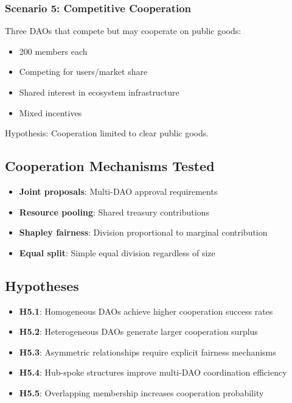 \subsubsection{Scenario 5: Competitive Cooperation}

Three DAOs that compete but may cooperate on public goods:
\begin{itemize}
    \item 200 members each
    \item Competing for users/market share
    \item Shared interest in ecosystem infrastructure
    \item Mixed incentives
\end{itemize}

Hypothesis: Cooperation limited to clear public goods.

\subsection{Cooperation Mechanisms Tested}

\begin{itemize}
    \item \textbf{Joint proposals}: Multi-DAO approval requirements
    \item \textbf{Resource pooling}: Shared treasury contributions
    \item \textbf{Shapley fairness}: Division proportional to marginal contribution
    \item \textbf{Equal split}: Simple equal division regardless of size
\end{itemize}

\subsection{Hypotheses}

\begin{itemize}
    \item \textbf{H5.1}: Homogeneous DAOs achieve higher cooperation success rates
    \item \textbf{H5.2}: Heterogeneous DAOs generate larger cooperation surplus
    \item \textbf{H5.3}: Asymmetric relationships require explicit fairness mechanisms
    \item \textbf{H5.4}: Hub-spoke structures improve multi-DAO coordination efficiency
    \item \textbf{H5.5}: Overlapping membership increases cooperation probability
\end{itemize}


